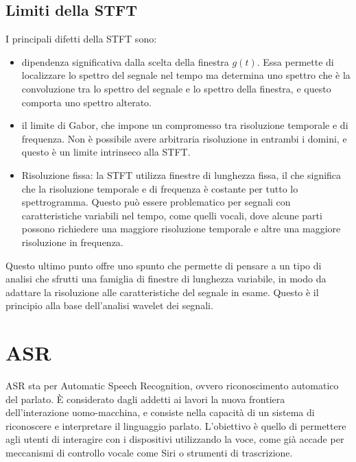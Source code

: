 \documentclass[12pt, a4paper]{article}
\begin{document}
\subsection{Limiti della STFT}
I principali difetti della STFT sono:
\begin{itemize}
  \item dipendenza significativa dalla scelta della finestra $g(t)$. Essa permette di localizzare lo spettro del segnale nel tempo ma determina uno spettro che è la convoluzione tra lo spettro del segnale e lo spettro della finestra, e questo comporta uno spettro alterato.
  \item il limite di Gabor, che impone un compromesso tra risoluzione temporale e di frequenza. Non è possibile avere arbitraria risoluzione in entrambi i domini, e questo è un limite intrinseco alla STFT.
  \item Risoluzione fissa: la STFT utilizza finestre di lunghezza fissa, il che significa che la risoluzione temporale e di frequenza è costante per tutto lo spettrogramma. Questo può essere problematico per segnali con caratteristiche variabili nel tempo, come quelli vocali, dove alcune parti possono richiedere una maggiore risoluzione temporale e altre una maggiore risoluzione in frequenza.
\end{itemize}

Questo ultimo punto offre uno spunto che permette di pensare a un tipo di analisi che sfrutti una famiglia di finestre di lunghezza variabile, in modo da adattare la risoluzione alle caratteristiche del segnale in esame. Questo è il principio alla base dell'analisi wavelet dei segnali.

\section{ASR}

ASR sta per Automatic Speech Recognition, ovvero riconoscimento automatico del parlato. È considerato dagli addetti ai lavori la nuova frontiera dell'interazione uomo-macchina, e consiste nella capacità di un sistema di riconoscere e interpretare il linguaggio parlato. L'obiettivo è quello di permettere agli utenti di interagire con i dispositivi utilizzando la voce, come già accade per meccanismi di controllo vocale come Siri o strumenti di trascrizione.
\end{document}
